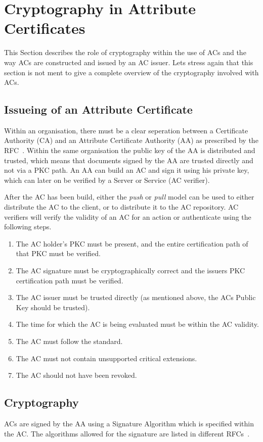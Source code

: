 \documentclass[10pt,conference,a4paper]{IEEEtran}
\begin{document}
\section{Cryptography in Attribute Certificates}
\label{cryptography_in_ac}
This Section describes the role of cryptography within the use of ACs and the way ACs are constructed and issued by an AC issuer. Lets stress again that this section is not ment to give a complete overview of the cryptography involved with ACs.

\subsection{Issueing of an Attribute Certificate}
Within an organisation, there must be a clear seperation between a Certificate Authority (CA) and an Attribute Certificate Authority (AA) as prescribed by the RFC~\cite{rfc_ac}. Within the same organisation the public key of the AA is distributed and trusted, which means that documents signed by the AA are trusted directly and not via a PKC path. An AA can build an AC and sign it using his private key, which can later on be verified by a Server or Service (AC verifier).

After the AC has been build, either the \textit{push} or \textit{pull} model can be used to either distribute the AC to the client, or to distribute it to the AC repository. AC verifiers will verify the validity of an AC for an action or authenticate using the following steps.~\cite{rfc_ac}
\begin{enumerate}
	\item The AC holder's PKC must be present, and the entire certification path of that PKC must be verified.
	\item The AC signature must be cryptographically correct and the issuers PKC certification path must be verified.
	\item The AC issuer must be trusted directly (as mentioned above, the ACs Public Key should be trusted).
	\item The time for which the AC is being evaluated must be within the AC validity.
	\item The AC must follow the standard.
	\item The AC must not contain unsupported critical extensions.
	\item The AC should not have been revoked.
\end{enumerate}

\subsection{Cryptography}
ACs are signed by the AA using a Signature Algorithm which is specified within the AC. The algorithms allowed for the signature are listed in different RFCs~\cite{rfc_alg1,rfc_alg2,rfc_alg3,rfc_alg4}.
\end{document}
